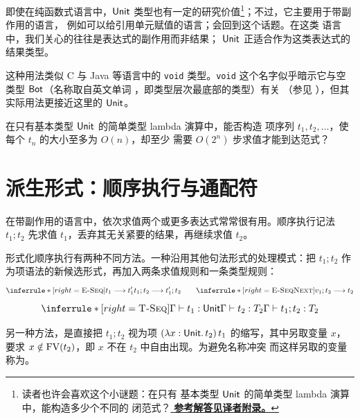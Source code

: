 即使在纯函数式语言中，\(\mathsf{Unit}\) 类型也有一定的研究价值\footnote{%
\label{ex:11.2-unit-puzzle}读者也许会喜欢这个小谜题：在只有
基本类型 \(\mathsf{Unit}\) 的简单类型 lambda 演算中，能构造多少个不同的
闭范式？\hyperref[sol:translator:11.2-unit-puzzle]{\textcolor{TAPLLink}{%
\textbf{参考解答见译者附录。}}}}；不过，它主要用于带副作用的语言，
例如可以给引用单元赋值的语言；会回到这个话题。在这类
语言中，我们关心的往往是表达式的副作用而非结果；
\(\mathsf{Unit}\) 正适合作为这类表达式的结果类型。

这种用法类似 C 与 Java 等语言中的 \texttt{void} 类型。\texttt{void}
这个名字似乎暗示它与空类型 \(\mathsf{Bot}\)（名称取自英文单词
，即类型层次最底部的类型）有关
（参见 ），但其实际用法更接近这里的
\(\mathsf{Unit}\)。

\begin{exercise}[\(\star\star\star\)]
\label{ex:11.2.1}
在只有基本类型 \(\mathsf{Unit}\) 的简单类型 lambda 演算中，能否构造
项序列 \(t_1,t_2,\ldots\)，使每个 \(t_n\) 的大小至多为 \(O(n)\)，却至少
需要 \(O(2^n)\) 步求值才能到达范式？
\end{exercise}

\section{派生形式：顺序执行与通配符}
\label{sec:11.3}

在带副作用的语言中，依次求值两个或更多表达式常常很有用。顺序执行记法
\(t_1;t_2\) 先求值 \(t_1\)，丢弃其无关紧要的结果，再继续求值 \(t_2\)。

形式化顺序执行有两种不同方法。一种沿用其他句法形式的处理模式：把
\(t_1;t_2\) 作为项语法的新候选形式，再加入两条求值规则和一条类型规则：
\[
\inferrule*[right=\textsc{E-Seq}]
 {t_1\trans t_1'}{t_1;t_2\trans t_1';t_2}
\qquad
\inferrule*[right=\textsc{E-SeqNext}]
 { }{v_1;t_2\trans t_2}
\]
\[
\inferrule*[right=\textsc{T-Seq}]
 {\Gamma\vdash t_1:\tapltype{Unit}\\\Gamma\vdash t_2:T_2}
 {\Gamma\vdash t_1;t_2:T_2}
\]


另一种方法，是直接把 \(t_1;t_2\) 视为项
\((\lambda x:\mathsf{Unit}.\,t_2)\,t_1\) 的缩写，其中另取变量 \(x\)，
要求 \(x\notin\operatorname{FV}(t_2)\)，即 \(x\) 不在 \(t_2\) 中自由出现。为避免名称冲突
而这样另取的变量称为。


